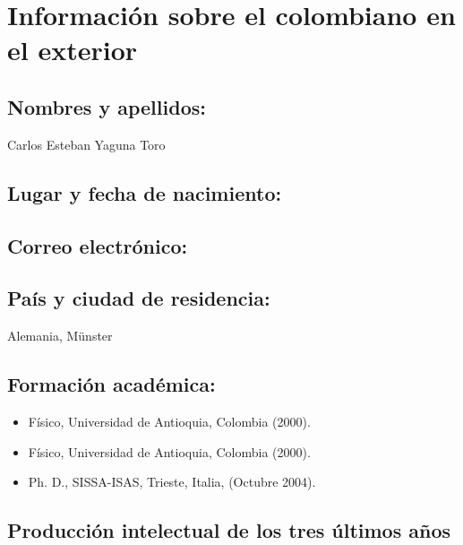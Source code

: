 \section{Información sobre el colombiano en el exterior}
\subsection{Nombres y apellidos: }
Carlos Esteban Yaguna Toro
\subsection{Lugar y fecha de nacimiento: }
\fnyaguna
\subsection{Correo electrónico: }
\emyaguna
\subsection{País y ciudad de residencia: }
Alemania, M\"unster
\subsection{Formación académica:}
\begin{itemize}
\item Físico, Universidad de Antioquia, Colombia (2000).
\item Físico, Universidad de Antioquia, Colombia (2000).
\item Ph. D., SISSA-ISAS, Trieste, Italia, (Octubre 2004).
\end{itemize}
\subsection{Producción intelectual de los tres últimos años}
